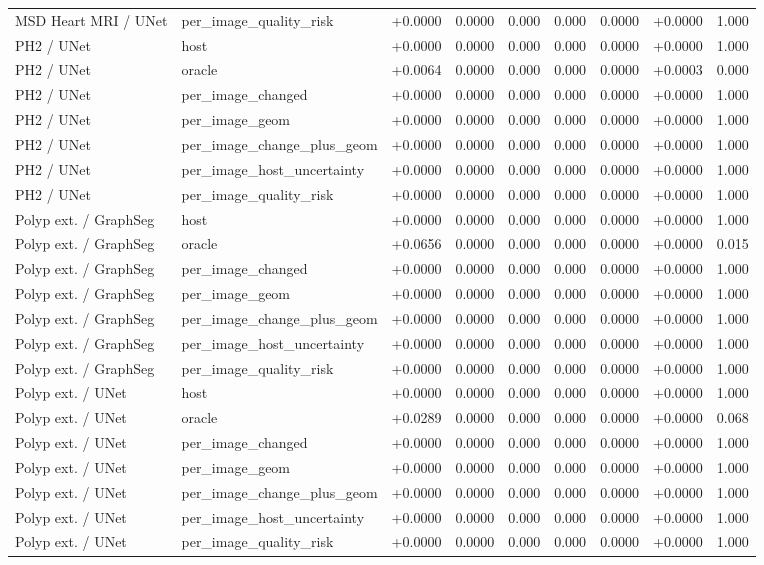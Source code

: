 \begin{table}[t]
\begin{tabular}{lllllllll}
MSD Heart MRI / UNet & per\_image\_quality\_risk & +0.0000 & 0.0000 & 0.000 & 0.000 & 0.0000 & +0.0000 & 1.000 \\
PH2 / UNet & host & +0.0000 & 0.0000 & 0.000 & 0.000 & 0.0000 & +0.0000 & 1.000 \\
PH2 / UNet & oracle & +0.0064 & 0.0000 & 0.000 & 0.000 & 0.0000 & +0.0003 & 0.000 \\
PH2 / UNet & per\_image\_changed & +0.0000 & 0.0000 & 0.000 & 0.000 & 0.0000 & +0.0000 & 1.000 \\
PH2 / UNet & per\_image\_geom & +0.0000 & 0.0000 & 0.000 & 0.000 & 0.0000 & +0.0000 & 1.000 \\
PH2 / UNet & per\_image\_change\_plus\_geom & +0.0000 & 0.0000 & 0.000 & 0.000 & 0.0000 & +0.0000 & 1.000 \\
PH2 / UNet & per\_image\_host\_uncertainty & +0.0000 & 0.0000 & 0.000 & 0.000 & 0.0000 & +0.0000 & 1.000 \\
PH2 / UNet & per\_image\_quality\_risk & +0.0000 & 0.0000 & 0.000 & 0.000 & 0.0000 & +0.0000 & 1.000 \\
Polyp ext. / GraphSeg & host & +0.0000 & 0.0000 & 0.000 & 0.000 & 0.0000 & +0.0000 & 1.000 \\
Polyp ext. / GraphSeg & oracle & +0.0656 & 0.0000 & 0.000 & 0.000 & 0.0000 & +0.0000 & 0.015 \\
Polyp ext. / GraphSeg & per\_image\_changed & +0.0000 & 0.0000 & 0.000 & 0.000 & 0.0000 & +0.0000 & 1.000 \\
Polyp ext. / GraphSeg & per\_image\_geom & +0.0000 & 0.0000 & 0.000 & 0.000 & 0.0000 & +0.0000 & 1.000 \\
Polyp ext. / GraphSeg & per\_image\_change\_plus\_geom & +0.0000 & 0.0000 & 0.000 & 0.000 & 0.0000 & +0.0000 & 1.000 \\
Polyp ext. / GraphSeg & per\_image\_host\_uncertainty & +0.0000 & 0.0000 & 0.000 & 0.000 & 0.0000 & +0.0000 & 1.000 \\
Polyp ext. / GraphSeg & per\_image\_quality\_risk & +0.0000 & 0.0000 & 0.000 & 0.000 & 0.0000 & +0.0000 & 1.000 \\
Polyp ext. / UNet & host & +0.0000 & 0.0000 & 0.000 & 0.000 & 0.0000 & +0.0000 & 1.000 \\
Polyp ext. / UNet & oracle & +0.0289 & 0.0000 & 0.000 & 0.000 & 0.0000 & +0.0000 & 0.068 \\
Polyp ext. / UNet & per\_image\_changed & +0.0000 & 0.0000 & 0.000 & 0.000 & 0.0000 & +0.0000 & 1.000 \\
Polyp ext. / UNet & per\_image\_geom & +0.0000 & 0.0000 & 0.000 & 0.000 & 0.0000 & +0.0000 & 1.000 \\
Polyp ext. / UNet & per\_image\_change\_plus\_geom & +0.0000 & 0.0000 & 0.000 & 0.000 & 0.0000 & +0.0000 & 1.000 \\
Polyp ext. / UNet & per\_image\_host\_uncertainty & +0.0000 & 0.0000 & 0.000 & 0.000 & 0.0000 & +0.0000 & 1.000 \\
Polyp ext. / UNet & per\_image\_quality\_risk & +0.0000 & 0.0000 & 0.000 & 0.000 & 0.0000 & +0.0000 & 1.000 \\
\bottomrule
\end{tabular}
\end{table}
